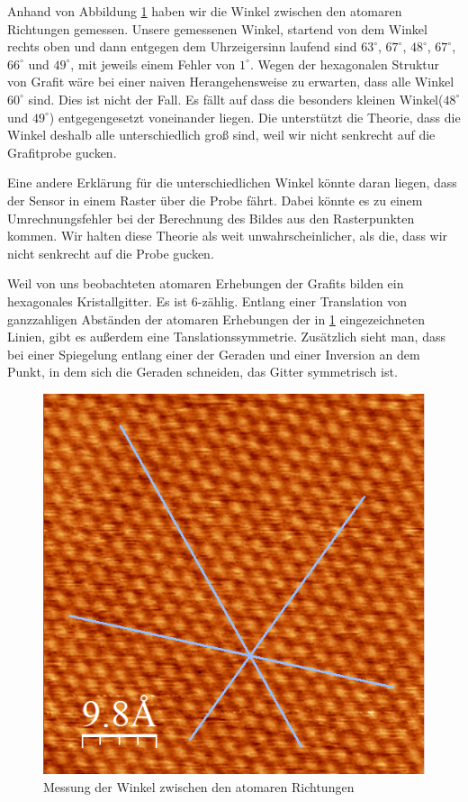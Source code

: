 \documentclass[10pt,a4paper]{article}
\begin{document}
Anhand von Abbildung \ref{Messungerh6} haben wir die Winkel zwischen den atomaren Richtungen gemessen. Unsere gemessenen Winkel, startend von dem Winkel rechts oben und dann entgegen dem Uhrzeigersinn laufend sind $63^\circ$, $67^\circ$, $48^\circ$, $67^\circ$, $66^\circ$ und $49^\circ$, mit jeweils einem Fehler von $1^\circ$. Wegen der hexagonalen Struktur von Grafit wäre bei einer naiven Herangehensweise zu erwarten, dass alle Winkel $60^\circ$ sind. Dies ist nicht der Fall. Es fällt auf dass die besonders kleinen Winkel($48^\circ$ und $49^\circ$) entgegengesetzt voneinander liegen. Die unterstützt die Theorie, dass die Winkel deshalb alle unterschiedlich groß sind, weil wir nicht senkrecht auf die Grafitprobe gucken.

 Eine andere Erklärung für die unterschiedlichen Winkel könnte daran liegen, dass der Sensor in einem Raster über die Probe fährt. Dabei könnte es zu einem Umrechnungsfehler bei der Berechnung des Bildes aus den Rasterpunkten kommen. Wir halten diese Theorie als weit unwahrscheinlicher, als die, dass wir nicht senkrecht auf die Probe gucken.
 
 Weil von uns beobachteten atomaren Erhebungen der Grafits bilden ein hexagonales Kristallgitter. Es ist 6-zählig. Entlang einer Translation von ganzzahligen Abständen der atomaren Erhebungen der in \ref{Messungerh6} eingezeichneten Linien, gibt es außerdem eine Tanslationssymmetrie. Zusätzlich sieht man, dass bei einer Spiegelung entlang einer der Geraden und einer Inversion an dem Punkt, in dem sich die Geraden schneiden, das Gitter symmetrisch ist.

\begin{figure}[h]
	\centering
	
	\includegraphics[scale = 0.7]{Winkelmessung_kristall.png}
	
	\caption{Messung der Winkel zwischen den atomaren Richtungen}
	\label{Messungerh6}
\end{figure}
\end{document}
